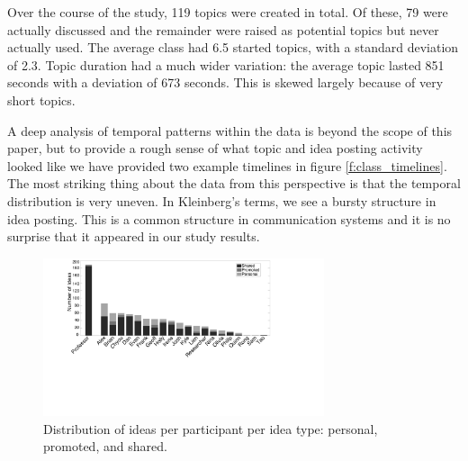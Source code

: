 Over the course of the study, 119 topics were created in total. Of these, 79 were actually discussed and the remainder were raised as potential topics but never actually used. The average class had 6.5 started topics, with a standard deviation of 2.3. Topic duration had a much wider variation: the average topic lasted 851 seconds with a deviation of 673 seconds. This is skewed largely because of very short topics. 

A deep analysis of temporal patterns within the data is beyond the scope of this paper, but to provide a rough sense of what topic and idea posting activity looked like we have provided two example timelines in figure \ref{f:class_timelines}. The most striking thing about the data from this perspective is that the temporal distribution is very uneven. In Kleinberg's terms, we see a bursty structure \citep{Kleinberg:2003ej} in idea posting. This is a common structure in communication systems and it is no surprise that it appeared in our study results. 



\begin{figure}[t]
\centering
\includegraphics[width=3.25in]{figures/tincan/ideas_per_participant.pdf}
\caption{Distribution of ideas per participant per idea type: personal, promoted, and shared.}
\label{f:ideas_per_participant}
\end{figure}

